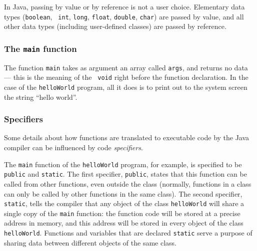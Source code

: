 \documentclass[a4paper]{book}
\theoremstyle{changebreak}                %
\begin{document}
In Java, passing by value or by reference is not a user choice.
Elementary data types ({\tt boolean}, {\tt
  int}, {\tt long}, {\tt float}, {\tt double}, {\tt char}) are passed
by value, and all other data types (including user-defined classes)
are passed by reference.

\subsubsection{The {\tt main} function}
The function {\tt main} takes as argument an
array called {\tt args}, and
returns no data --- this is the meaning of the {\tt
  void} right before the function declaration.
In the case of the {\tt helloWorld} program, all it does is to print
out to the system screen the string ``hello world''.

\subsubsection{Specifiers}
Some details about how functions are translated to executable code by
the Java compiler can be
influenced by code {\it specifiers}.

The {\tt main} function of the {\tt helloWorld} program, for example,
is specified to be {\tt public} and {\tt static}. The first specifier,
{\tt public}, states that this function can be called
from other functions, even outside the class (normally, functions in a
class can only be called by other functions in the same class). The
second specifier, {\tt static}, tells the
compiler that any object of the class {\tt helloWorld}
will share a single copy of the {\tt main} function:
the function code will be stored at a precise address in
memory, and this address will be stored in every
object of the class {\tt helloWorld}. Functions and
variables that are declared {\tt static} serve a purpose
of sharing data between different objects of the same class.
\end{document}
